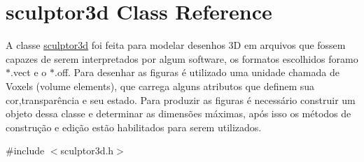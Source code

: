 \hypertarget{classsculptor3d}{}\section{sculptor3d Class Reference}
\label{classsculptor3d}


A classe \mbox{\hyperlink{classsculptor3d}{sculptor3d}} foi feita para modelar desenhos 3D em arquivos que fossem capazes de serem interpretados por algum software, os formatos escolhidos foramo $\ast$.vect e o $\ast$.off. Para desenhar as figuras é utilizado uma unidade chamada de Voxels (volume elements), que carrega alguns atributos que definem sua cor,transparência e seu estado. Para produzir as figuras é necessário construir um objeto dessa classe e determinar as dimensões máximas, após isso os métodos de construção e edição estão habilitados para serem utilizados.  




{\ttfamily \#include $<$sculptor3d.\+h$>$}

